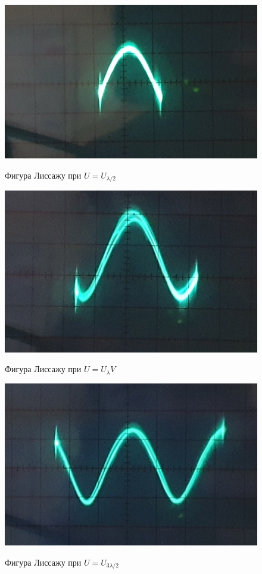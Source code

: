 \documentclass{article}
\begin{document}
\begin{figure}[H]
  \centering
  \includegraphics[width=\textwidth]{L1.jpg}\label{fig:L1}
  \caption{Фигура Лиссажу при \(U = U_{\lambda/2}\)}
\end{figure}

\begin{figure}[H]
  \centering
  \includegraphics[width=\textwidth]{L2.jpg}\label{fig:L2}
  \caption{Фигура Лиссажу при \(U = U_{\lambda}V\)}
\end{figure}

\begin{figure}[H]
  \centering
  \includegraphics[width=\textwidth]{L3.jpg}\label{fig:L3}
  \caption{Фигура Лиссажу при \(U = U_{3\lambda/2}\)}
\end{figure}
\end{document}
